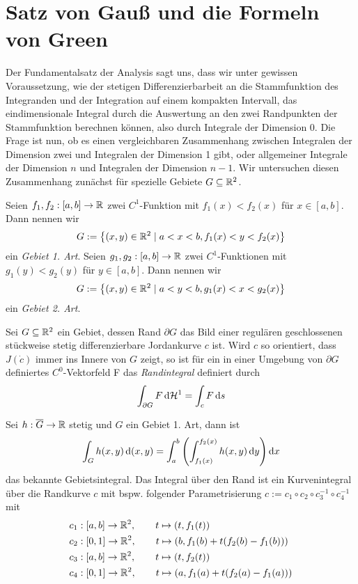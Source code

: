 \documentclass[
pdftex,
oneside,
headsepline,
11pt, 
]{scrreprt}
\begin{document}
\section{Satz von Gauß und die Formeln von Green}
Der Fundamentalsatz der Analysis sagt uns, dass wir unter gewissen Voraussetzung, wie der stetigen Differenzierbarbeit an die Stammfunktion des Integranden und der Integration auf einem kompakten Intervall, das eindimensionale Integral durch die Auswertung an den zwei Randpunkten der Stammfunktion berechnen können, also durch Integrale der Dimension 0. Die Frage ist nun, ob es einen vergleichbaren Zusammenhang zwischen Integralen der Dimension zwei und Integralen der Dimension 1 gibt, oder allgemeiner Integrale der Dimension $n$ und Integralen der Dimension $n-1$. Wir untersuchen diesen Zusammenhang zunächst für spezielle Gebiete $G\subseteq \mathbb{R}^2$.  
\begin{de}
	Seien $f_1,f_2:[a,b]\to \mathbb{R}$ zwei $C^1$-Funktion mit $f_1(x)<f_2(x)$ für $x\in[a,b]$. Dann nennen wir \[G:=\left\lbrace (x,y)\in\mathbb{R}^2\mid a<x<b, f_1(x)<y<f_2(x)\right\rbrace\] ein \textit{Gebiet 1. Art}. 
	Seien $g_1,g_2:[a,b]\to \mathbb{R}$ zwei $C^1$-Funktionen mit $g_1(y)<g_2(y)$ für $y\in[a,b]$. Dann nennen wir \[G:=\left\lbrace (x,y)\in\mathbb{R}^2\mid a<y<b, g_1(x)<x<g_2(x)\right\rbrace\] ein \textit{Gebiet 2. Art}. 
\end{de}
\begin{de}[Randintegral im $\R^2$]
	Sei $G\subseteq \mathbb{R}^2$ ein Gebiet, dessen Rand $\partial G$ das Bild einer regulären geschlossenen stückweise stetig differenzierbare Jordankurve $c$ ist. Wird $c$ so orientiert, dass $J(\dot{c})$ immer ins Innere von $G$ zeigt, so ist für ein in einer Umgebung von $\partial G$ definiertes $C^0$-Vektorfeld F das \textit{Randintegral} definiert durch \[ \int_{\partial G} F \mathop{}\!\mathrm{d} \mathcal{H}^1=\int_c F \mathop{}\!\mathrm{d} s \]
\end{de}
Sei $h:\overline{G}\to \mathbb{R}$ stetig und $G$ ein Gebiet 1. Art, dann ist 
\[ \int_G h(x,y)\mathop{}\!\mathrm{d}(x,y)=\int_a^b \left(  \int_{f_1(x)}^{f_2(x)} h(x,y)\mathop{}\!\mathrm{d} y \right)\mathop{}\!\mathrm{d} x \]
das bekannte Gebietsintegral. Das Integral über den Rand ist ein Kurvenintegral über die Randkurve $c$ mit bspw. folgender Parametrisierung $c:=c_1\circ c_2\circ c_3^{-1}\circ c_4^{-1}$ mit
\begin{align*}
&c_1:[a,b]\to \mathbb{R}^2,\qquad t\mapsto(t,f_1(t))\\
&c_2:[0,1]\to \mathbb{R}^2,\qquad t\mapsto (b,f_1(b)+t(f_2(b)-f_1(b)))\\
&c_3:[a,b]\to\mathbb{R}^2,\qquad t\mapsto (t,f_2(t))\\
&c_4:[0,1]\to\mathbb{R}^2,\qquad t\mapsto (a,f_1(a)+t(f_2(a)-f_1(a)))
\end{align*}
\end{document}
